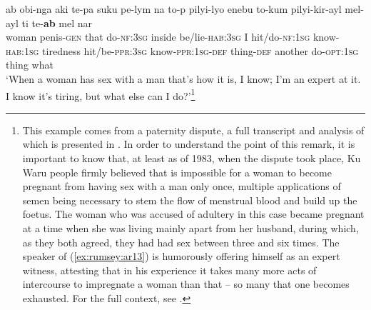 \documentclass[output=paper]{langsci/langscibook}
\begin{document}
\begin{exe}
	\ex \label{ex:rumsey:ar13}
	\gll ab obi-nga aki te-pa suku pe-lym na to-p pilyi-lyo enebu to-kum pilyi-kir-ayl mel-ayl ti te-\textbf{ab} mel nar\\
	woman penis-\textsc{gen} that do-\textsc{nf}:3\textsc{sg} inside be/lie-\textsc{hab}:3\textsc{sg} I hit/do-\textsc{nf}:1\textsc{sg} know-\textsc{hab}:1\textsc{sg} tiredness hit/be-\textsc{ppr}:3\textsc{sg} know-\textsc{ppr}:1\textsc{sg}-\textsc{def}		thing-\textsc{def} another do-\textsc{opt}:1\textsc{sg} thing what\\
	\trans ‘When a woman has sex with a man that's how it is, I know; I'm an expert at it. I know it’s tiring, but what else can I do?’\footnote{This example comes from a paternity dispute, a full transcript and analysis of which is presented in \cite{MerlanRumsey1986}. In order to understand the point of this remark, it is important to know that, at least as of 1983, when the dispute took place, Ku Waru people firmly believed that is impossible for a woman to become pregnant from having sex with a man only once, multiple applications of semen being necessary to stem the flow of menstrual blood and build up the foetus. The woman who was accused of adultery in this case became pregnant at a time when she was living mainly apart from her husband, during which, as they both agreed, they had had sex between three and six times. The speaker of (\ref{ex:rumsey:ar13}) is humorously offering himself as an expert witness, attesting that in his experience it takes many more acts of intercourse to impregnate a woman than that – so many that one becomes exhausted. For the full context, see \cite[100]{MerlanRumsey1986}.}
\end{exe}
\end{document}
